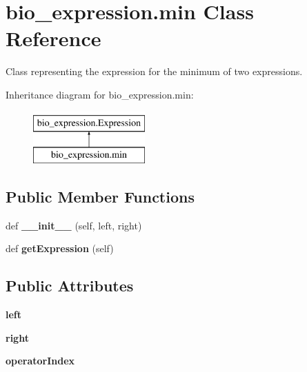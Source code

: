 \hypertarget{classbio__expression_1_1min}{}\section{bio\+\_\+expression.\+min Class Reference}
\label{classbio__expression_1_1min}


Class representing the expression for the minimum of two expressions.  


Inheritance diagram for bio\+\_\+expression.\+min\+:\begin{figure}[H]
\begin{center}
\leavevmode
\includegraphics[height=2.000000cm]{classbio__expression_1_1min}
\end{center}
\end{figure}
\subsection*{Public Member Functions}
\begin{DoxyCompactItemize}
\item 
def {\bfseries \+\_\+\+\_\+init\+\_\+\+\_\+} (self, left, right)\hypertarget{classbio__expression_1_1min_a5768148c265ccc8b524c3e609fb03f78}{}\label{classbio__expression_1_1min_a5768148c265ccc8b524c3e609fb03f78}

\item 
def {\bfseries get\+Expression} (self)\hypertarget{classbio__expression_1_1min_a9dc51dc8836412494d4f9590ad83c14b}{}\label{classbio__expression_1_1min_a9dc51dc8836412494d4f9590ad83c14b}

\end{DoxyCompactItemize}
\subsection*{Public Attributes}
\begin{DoxyCompactItemize}
\item 
{\bfseries left}\hypertarget{classbio__expression_1_1min_aad178b15b6a38a3487f0201ddf9b05da}{}\label{classbio__expression_1_1min_aad178b15b6a38a3487f0201ddf9b05da}

\item 
{\bfseries right}\hypertarget{classbio__expression_1_1min_a598a7f87c581405f46379788c9cfc682}{}\label{classbio__expression_1_1min_a598a7f87c581405f46379788c9cfc682}

\item 
{\bfseries operator\+Index}\hypertarget{classbio__expression_1_1min_ad7874a97ff7efd3577be120adbfb1979}{}\label{classbio__expression_1_1min_ad7874a97ff7efd3577be120adbfb1979}

\end{DoxyCompactItemize}


